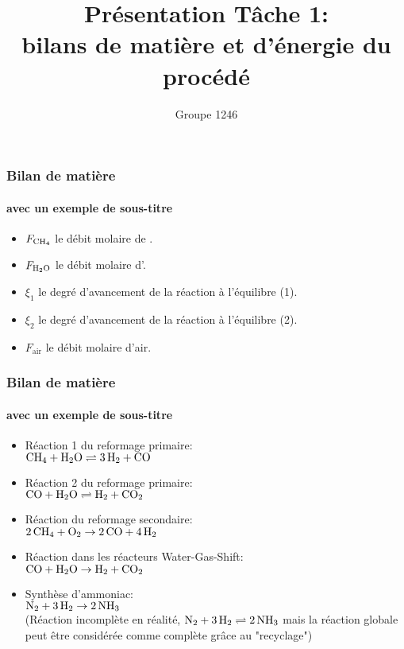 \documentclass{beamer}
\title{Présentation Tâche 1:\\ bilans de matière et d’énergie du procédé
}
\author{Groupe 1246}
\institute{École Polytechnique de Louvain}
\date{}
\begin{document}
\begin{frame}
\titlepage
\end{frame}


\begin{frame}
\frametitle{Bilan de matière}
\framesubtitle{avec un exemple de sous-titre}

\begin{itemize}
	\item $F_{}$ le débit molaire de \ce{CH4}.
	\item $F_{}$ le débit molaire d'\ce{H2O}.
	\item $\xi_1$ le degré d'avancement de la réaction à l'équilibre (1).
	\item $\xi_2$ le degré d'avancement de la réaction à l'équilibre (2).
	\item $F_{\text{air}}$ le débit molaire d'air.
\end{itemize}

\end{frame}




\begin{frame}
\frametitle{Bilan de matière}
\framesubtitle{avec un exemple de sous-titre}

\begin{itemize}
	\item Réaction 1 du reformage primaire:\\
	$\ce{CH_4} + \ce{H_{2}O} \rightleftharpoons \ce{3H_2} + \ce{CO}$
	\item Réaction 2 du reformage primaire:\\
	$\ce{CO} + \ce{H_{2}O} \rightleftharpoons \ce{H_2} + \ce{CO_2}$ 
	\item Réaction du reformage secondaire:\\
	$\ce{2CH_4} + \ce{O_2} \rightarrow \ce{2CO} + \ce{4H_2}$ 
	\item Réaction dans les réacteurs Water-Gas-Shift:\\
	$\ce{CO} + \ce{H_{2}O} \rightarrow \ce{H_2} + \ce{CO_2}$ 
	\item Synthèse d'ammoniac:\\
	$\ce{N_2} + \ce{3H_2} \rightarrow \ce{2NH_3}$\\
	(Réaction incomplète en réalité, $\ce{N_2} + \ce{3H_2} \rightleftharpoons \ce{2NH_3}$ mais la réaction globale peut être considérée comme complète grâce au "recyclage")
\end{itemize}

\end{frame}
\end{document}
